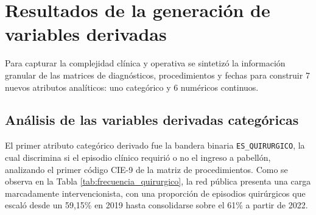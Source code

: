 


\section{Resultados de la generación de variables derivadas}
\label{sec:resultados_variables_derivadas}

Para capturar la complejidad clínica y operativa se sintetizó la información granular de las matrices de diagnósticos, procedimientos y fechas para construir 7 nuevos atributos analíticos: uno categórico y 6 numéricos continuos.

\subsection{Análisis de las variables derivadas categóricas}

El primer atributo categórico derivado fue la bandera binaria \texttt{ES\_QUIRURGICO}, la cual discrimina si el episodio clínico requirió o no el ingreso a pabellón, analizando el primer código CIE-9 de la matriz de procedimientos. Como se observa en la Tabla \ref{tab:frecuencia_quirurgico}, la red pública presenta una carga marcadamente intervencionista, con una proporción de episodios quirúrgicos que escaló desde un 59,15\% en 2019 hasta consolidarse sobre el 61\% a partir de 2022.

